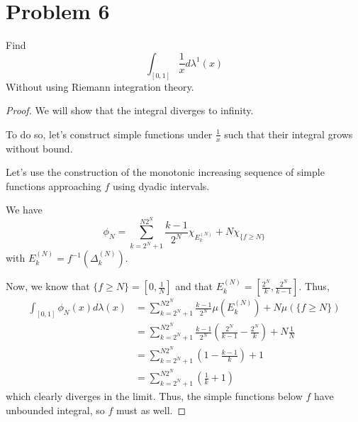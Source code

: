 \documentclass[fontsize=11pt]{scrartcl} %
\numberwithin{equation}{section} %
\numberwithin{figure}{section} %
\numberwithin{table}{section} %
\begin{document}
\section*{Problem 6}
Find
\[
\int_{[0,1]}\frac{1}{x}d\lambda^1(x)
\]
Without using Riemann integration theory.
\\
\begin{proof}
We will show that the integral diverges to infinity.

To do so, let's construct simple functions under $\frac{1}{x}$ such that their integral
grows without bound.

Let's use the construction of the monotonic increasing sequence of simple functions
approaching $f$ using dyadic intervals.

We have
\[
\phi_N = \sum_{k=2^N+1}^{N2^N} \frac{k-1}{2^N}\chi_{E_k^{(N)}} + N\chi_{\{f \geq N\}}
\]
with $E_k^{(N)} = f^{-1}(\Delta_k^{(N)})$.

Now, we know that $\{f\geq N\} = [0,\frac{1}{N}]$ and that
$E_k^{(N)} = [\frac{2^N}{k},\frac{2^N}{k-1}]$.
Thus,
\[
\begin{aligned}
\int_{[0,1]}\phi_N(x)d\lambda(x)  &= \sum_{k=2^N+1}^{N2^N} \frac{k-1}{2^N}\mu(E_k^{(N)}) + N\mu(\{f \geq N\})\\
                                &= \sum_{k=2^N+1}^{N2^N} \frac{k-1}{2^N}\left(\frac{2^N}{k-1}-\frac{2^N}{k}\right) + N\frac{1}{N}\\
                                &= \sum_{k=2^N+1}^{N2^N} \left(1 - \frac{k-1}{k}\right) + 1\\
                                &= \sum_{k=2^N+1}^{N2^N} \left(\frac{1}{k} + 1\right)
\end{aligned}
\]
which clearly diverges in the limit.
Thus, the simple functions below $f$ have unbounded integral, so $f$ must as well.
\end{proof}
\end{document}
